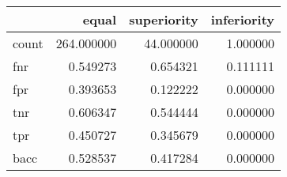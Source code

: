\begin{tabular}{lrrr}
\toprule
{} &       equal &  superiority &  inferiority \\
\midrule
count &  264.000000 &    44.000000 &     1.000000 \\
fnr   &    0.549273 &     0.654321 &     0.111111 \\
fpr   &    0.393653 &     0.122222 &     0.000000 \\
tnr   &    0.606347 &     0.544444 &     0.000000 \\
tpr   &    0.450727 &     0.345679 &     0.000000 \\
bacc  &    0.528537 &     0.417284 &     0.000000 \\
\bottomrule
\end{tabular}
